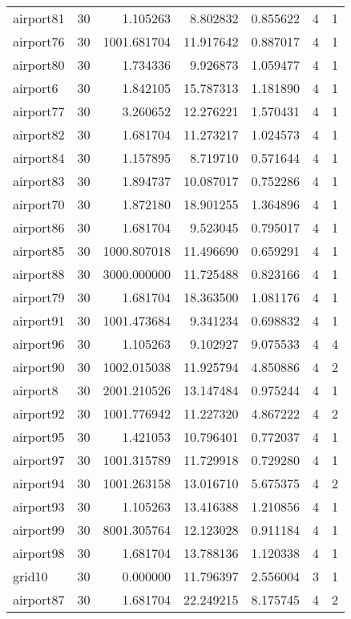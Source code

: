\documentclass[../../../thesis.tex]{subfiles}
\begin{document}
\begin{longtable}{|l|r|r|r|r|r|r|}
airport81 & 30 & 1.105263 & 8.802832 & 0.855622 & 4 & 1 \\
airport76 & 30 & 1001.681704 & 11.917642 & 0.887017 & 4 & 1 \\
airport80 & 30 & 1.734336 & 9.926873 & 1.059477 & 4 & 1 \\
airport6 & 30 & 1.842105 & 15.787313 & 1.181890 & 4 & 1 \\
airport77 & 30 & 3.260652 & 12.276221 & 1.570431 & 4 & 1 \\
airport82 & 30 & 1.681704 & 11.273217 & 1.024573 & 4 & 1 \\
airport84 & 30 & 1.157895 & 8.719710 & 0.571644 & 4 & 1 \\
airport83 & 30 & 1.894737 & 10.087017 & 0.752286 & 4 & 1 \\
airport70 & 30 & 1.872180 & 18.901255 & 1.364896 & 4 & 1 \\
airport86 & 30 & 1.681704 & 9.523045 & 0.795017 & 4 & 1 \\
airport85 & 30 & 1000.807018 & 11.496690 & 0.659291 & 4 & 1 \\
airport88 & 30 & 3000.000000 & 11.725488 & 0.823166 & 4 & 1 \\
airport79 & 30 & 1.681704 & 18.363500 & 1.081176 & 4 & 1 \\
airport91 & 30 & 1001.473684 & 9.341234 & 0.698832 & 4 & 1 \\
airport96 & 30 & 1.105263 & 9.102927 & 9.075533 & 4 & 4 \\
airport90 & 30 & 1002.015038 & 11.925794 & 4.850886 & 4 & 2 \\
airport8 & 30 & 2001.210526 & 13.147484 & 0.975244 & 4 & 1 \\
airport92 & 30 & 1001.776942 & 11.227320 & 4.867222 & 4 & 2 \\
airport95 & 30 & 1.421053 & 10.796401 & 0.772037 & 4 & 1 \\
airport97 & 30 & 1001.315789 & 11.729918 & 0.729280 & 4 & 1 \\
airport94 & 30 & 1001.263158 & 13.016710 & 5.675375 & 4 & 2 \\
airport93 & 30 & 1.105263 & 13.416388 & 1.210856 & 4 & 1 \\
airport99 & 30 & 8001.305764 & 12.123028 & 0.911184 & 4 & 1 \\
airport98 & 30 & 1.681704 & 13.788136 & 1.120338 & 4 & 1 \\
grid10 & 30 & 0.000000 & 11.796397 & 2.556004 & 3 & 1 \\
airport87 & 30 & 1.681704 & 22.249215 & 8.175745 & 4 & 2 \\

\end{longtable}
\end{document}
